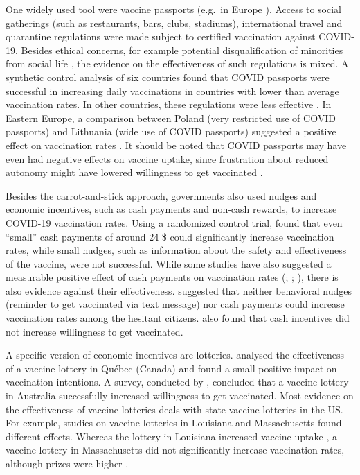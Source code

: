 \documentclass{scrbook}
\begin{document}
One widely used tool were vaccine passports (e.g.~in Europe
\parencite{niestadt_domestic_2021}). Access to social gatherings (such
as restaurants, bars, clubs, stadiums), international travel and
quarantine regulations were made subject to certified vaccination
against COVID-19. Besides ethical concerns, for example potential
disqualification of minorities from social life
\parencite{gostin_digital_2021}, the evidence on the effectiveness of
such regulations is mixed. A synthetic control analysis of six countries
found that COVID passports were successful in increasing daily
vaccinations in countries with lower than average vaccination rates. In
other countries, these regulations were less effective
\parencite{mills_effect_2022}. In Eastern Europe, a comparison between
Poland (very restricted use of COVID passports) and Lithuania (wide use
of COVID passports) suggested a positive effect on vaccination rates
\parencite{walkowiak_covid-19_2021}. It should be noted that COVID
passports may have even had negative effects on vaccine uptake, since
frustration about reduced autonomy might have lowered willingness to get
vaccinated \parencite{porat_vaccine_2021}.

Besides the carrot-and-stick approach, governments also used nudges and
economic incentives, such as cash payments and non-cash rewards, to
increase COVID-19 vaccination rates. Using a randomized control trial,
\textcite{campos-mercade_monetary_2021} found that even ``small'' cash
payments of around 24 \$ could significantly increase vaccination rates,
while small nudges, such as information about the safety and
effectiveness of the vaccine, were not successful. While some studies
have also suggested a measurable positive effect of cash payments on
vaccination rates (\cite{wong_guaranteed_2022};
\cite{kluver_incentives_2021}; \cite{kim_vaccination_2021-1}), there is
also evidence against their effectiveness. \textcite{jacobson_can_2022}
suggested that neither behavioral nudges (reminder to get vaccinated via
text message) nor cash payments could increase vaccination rates among
the hesitant citizens. \textcite{sprengholz_money_2021} also found that
cash incentives did not increase willingness to get vaccinated.

A specific version of economic incentives are lotteries.
\textcite{dube_exploring_2022} analysed the effectiveness of a vaccine
lottery in Québec (Canada) and found a small positive impact on
vaccination intentions. A survey, conducted by
\textcite{jun_association_2022}, concluded that a vaccine lottery in
Australia successfully increased willingness to get vaccinated. Most
evidence on the effectiveness of vaccine lotteries deals with state
vaccine lotteries in the US. For example, studies on vaccine lotteries
in Louisiana and Massachusetts found different effects. Whereas the
lottery in Louisiana increased vaccine uptake
\parencite{wang_moving_2023}, a vaccine lottery in Massachusetts did not
significantly increase vaccination rates, although prizes were higher
\parencite{kim_did_2023}.
\end{document}
